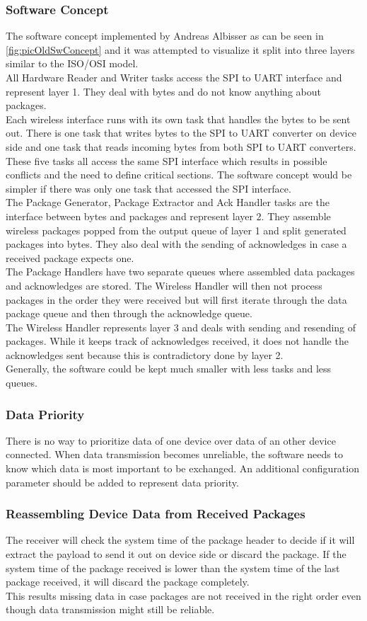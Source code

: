 \subsubsection{Software Concept}
The software concept implemented by Andreas Albisser as can be seen in \autoref{fig:picOldSwConcept} and it was attempted to visualize it split into three layers similar to the ISO/OSI model.\\
All Hardware Reader and Writer tasks access the SPI to UART interface and represent layer 1. They deal with bytes and do not know anything about packages.\\
Each wireless interface runs with its own task that handles the bytes to be sent out. There is one task that writes bytes to the SPI to UART converter on device side and one task that reads incoming bytes from both SPI to UART converters. These five tasks all access the same SPI interface which results in possible conflicts and the need to define critical sections. The software concept would be simpler if there was only one task that accessed the SPI interface.\\
The Package Generator, Package Extractor and Ack Handler tasks are the interface between bytes and packages and represent layer 2. They assemble wireless packages popped from the output queue of layer 1 and split generated packages into bytes. They also deal with the sending of acknowledges in case a received package expects one.\\
The Package Handlers have two separate queues where assembled data packages and acknowledges are stored. The Wireless Handler will then not process packages in the order they were received but will first iterate through the data package queue and then through the acknowledge queue.\\
The Wireless Handler represents layer 3 and deals with sending and resending of packages. While it keeps track of acknowledges received, it does not handle the acknowledges sent because this is contradictory done by layer 2.\\
Generally, the software could be kept much smaller with less tasks and less queues.
%
\subsubsection{Data Priority}
There is no way to prioritize data of one device over data of an other device connected. When data transmission becomes unreliable, the software needs to know which data is most important to be exchanged. An additional configuration parameter should be added to represent data priority.
%
\subsubsection{Reassembling Device Data from Received Packages}
The receiver will check the system time of the package header to decide if it will extract the payload to send it out on device side or discard the package. If the system time of the package received is lower than the system time of the last package received, it will discard the package completely.\\
This results missing data in case packages are not received in the right order even though data transmission might still be reliable.